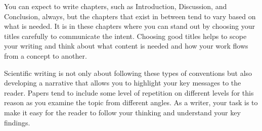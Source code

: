 You can expect to write chapters, such as Introduction, Discussion, and Conclusion, always, but the chapters that exist in between tend to vary based on what is needed.
It is in these chapters where you can stand out by choosing your titles carefully to communicate the intent.
Choosing good titles helps to scope your writing and think about what content is needed and how your work flows from a concept to another.

Scientific writing is not only about following these types of conventions but also developing a narrative that allows you to highlight your key messages to the reader.
Papers tend to include some level of repetition on different levels for this reason as you examine the topic from different angles.
As a writer, your task is to make it easy for the reader to follow your thinking and understand your key findings.
